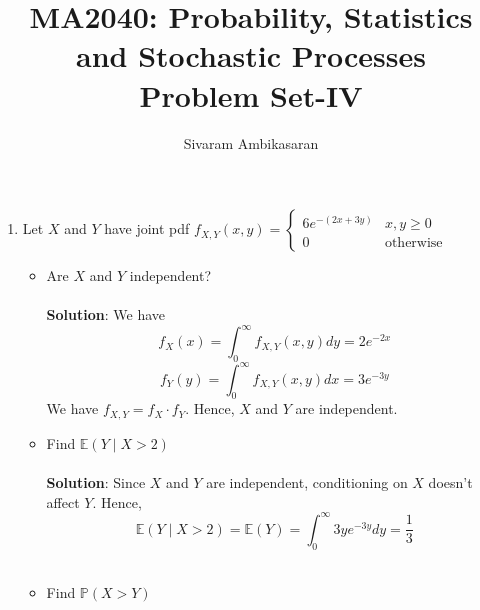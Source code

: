 \documentclass{article}
\title{MA2040: Probability, Statistics and Stochastic Processes\\
Problem Set-IV}
\author{Sivaram Ambikasaran}
\newcommand{\dint}{\displaystyle\int}
\newcommand{\Pb}{\mathbb{P}}
\newcommand{\bkt}[1]{\left(#1\right)}
\newcommand{\soln}[1]{\\ \textbf{Solution}:#1\\}
\begin{document}
	\maketitle
	\begin{enumerate}
		\item
		Let $X$ and $Y$ have joint pdf $f_{X,Y}(x,y) = \begin{cases}
		6 e^{-\bkt{2x+3y}} & x,y \geq 0\\
		0 & \text{otherwise}
		\end{cases}$
	\begin{itemize}
		\item
		Are $X$ and $Y$ independent?\\
		\soln{
		We have
		$$f_X(x) = \dint_0^{\infty}f_{X,Y}(x,y)dy = 2e^{-2x}$$
		$$f_Y(y) = \dint_0^{\infty}f_{X,Y}(x,y)dx = 3e^{-3y}$$
		We have $f_{X,Y} = f_X \cdot f_Y$. Hence, $X$ and $Y$ are independent.
		}
		\item
		Find $\mathbb{E}\bkt{Y \mid X>2}$\\
		\soln{
		Since $X$ and $Y$ are independent, conditioning on $X$ doesn't affect $Y$. Hence, $$\mathbb{E}\bkt{Y \mid X>2} = \mathbb{E}\bkt{Y} = \dint_0^{\infty}3ye^{-3y}dy = \dfrac13$$
		}
		\item
		Find $\Pb\bkt{X > Y}$\\
		

\end{itemize}
\end{enumerate}
\end{document}

